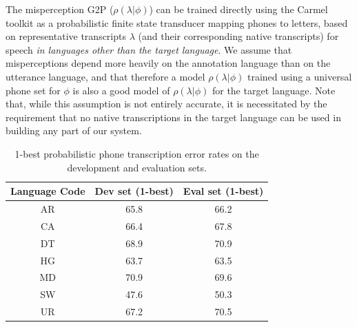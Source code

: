 The misperception G2P ($\rho(\lambda|\phi)$) can be trained directly 
using the Carmel toolkit
\cite{Carmel} as a probabilistic finite state transducer mapping
phones to letters, based on representative transcripts $\lambda$ (and
their corresponding native transcripts) for speech {\em in languages
other than the target language}. We assume that misperceptions
depend more heavily on the annotation language than on the utterance
language, and that therefore a model $\rho(\lambda|\phi)$ trained
using a universal phone set for $\phi$ is also a good model of
$\rho(\lambda|\phi)$ for the target language. Note that, while this
assumption is not entirely accurate, it is necessitated by the
requirement that no native transcriptions in the target language can
be used in building any part of our system.

\begin{table}[t]
\centering
\begin{tabular}{| c || c | c |}
\hline
Language Code & Dev set (1-best) & Eval set (1-best) \\
\hline
AR & 65.8 & 66.2 \\
CA & 66.4 & 67.8 \\
DT & 68.9 & 70.9 \\
HG & 63.7 & 63.5 \\
MD & 70.9 & 69.6 \\
SW & 47.6 & 50.3 \\
UR & 67.2 & 70.5  \\
\hline
\end{tabular}
\caption{1-best probabilistic phone transcription error rates on the development and evaluation sets.}
\label{tab:LPER}
\end{table}

